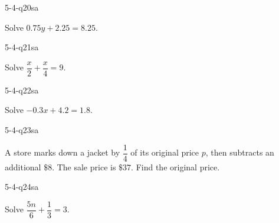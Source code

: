 \begin{practiceQuestion}{5-4-q20}{sa}
\begin{questionText}
Solve $0.75y + 2.25 = 8.25$.
\end{questionText}
\end{practiceQuestion}

\begin{practiceQuestion}{5-4-q21}{sa}
\begin{questionText}
Solve $\dfrac{x}{2} + \dfrac{x}{4} = 9$.
\end{questionText}
\end{practiceQuestion}

\begin{practiceQuestion}{5-4-q22}{sa}
\begin{questionText}
Solve $-0.3x + 4.2 = 1.8$.
\end{questionText}
\end{practiceQuestion}

\begin{practiceQuestion}{5-4-q23}{sa}
\begin{questionText}
A store marks down a jacket by $\dfrac{1}{4}$ of its original price $p$, then subtracts an additional $\$8$. The sale price is $\$37$. Find the original price.
\end{questionText}
\end{practiceQuestion}

\begin{practiceQuestion}{5-4-q24}{sa}
\begin{questionText}
Solve $\dfrac{5n}{6} + \dfrac{1}{3} = 3$.
\end{questionText}
\end{practiceQuestion}

